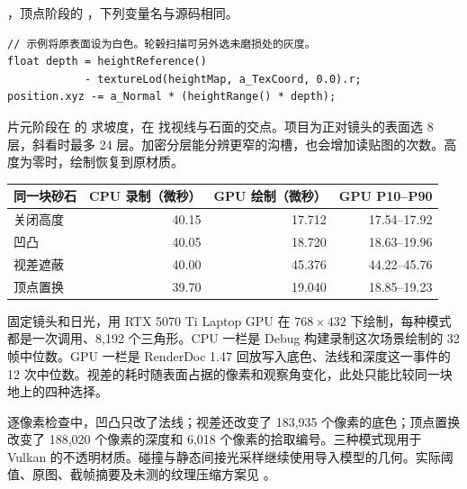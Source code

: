 \noindent{}，顶点阶段的 ，下列变量名与源码相同。
\begin{lstlisting}
// 示例将原表面设为白色。轮毂扫描可另外选未磨损处的灰度。
float depth = heightReference()
            - textureLod(heightMap, a_TexCoord, 0.0).r;
position.xyz -= a_Normal * (heightRange() * depth);
\end{lstlisting}
片元阶段在  的  求坡度，在  找视线与石面的交点。项目为正对镜头的表面选 8 层，斜看时最多 24 层。加密分层能分辨更窄的沟槽，也会增加读贴图的次数。高度为零时，绘制恢复到原材质。

{\smalltable\noindent\begin{tabularx}{\linewidth}{@{}Xrrr@{}}\toprule
同一块砂石 & CPU 录制（微秒）& GPU 绘制（微秒） & GPU P10--P90\\\midrule
关闭高度 & 40.15 & 17.712 & 17.54--17.92\\
凹凸 & 40.05 & 18.720 & 18.63--19.96\\
视差遮蔽 & 40.00 & 45.376 & 44.22--45.76\\
顶点置换 & 39.70 & 19.040 & 18.85--19.23\\\bottomrule
\end{tabularx}}

固定镜头和日光，用 RTX 5070 Ti Laptop GPU 在 $768\times432$ 下绘制，每种模式都是一次调用、8,192 个三角形。CPU 一栏是 Debug 构建录制这次场景绘制的 32 帧中位数。GPU 一栏是 RenderDoc 1.47 回放写入底色、法线和深度这一事件的 12 次中位数。视差的耗时随表面占据的像素和观察角变化，此处只能比较同一块地上的四种选择。

逐像素检查中，凹凸只改了法线；视差还改变了 183,935 个像素的底色；顶点置换改变了 188,020 个像素的深度和 6,018 个像素的拾取编号。三种模式现用于 Vulkan 的不透明材质。碰撞与静态间接光采样继续使用导入模型的几何。实际阈值、原图、截帧摘要及未测的纹理压缩方案见 。

